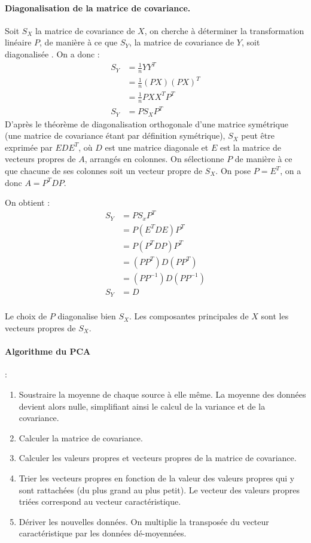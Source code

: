 \paragraph{Diagonalisation de la matrice de covariance.} Soit $S_X$ la matrice de covariance de $X$, on cherche à déterminer la transformation linéaire $P$, de manière à ce que $S_Y$, la matrice de covariance de $Y$, soit diagonalisée \cite{PCA}  \cite{PCA2}. 
On a donc : 
\begin{equation}
	\begin{split}
	 S_Y &= \frac{1}{n}YY^T \\
	&= \frac{1}{n}(PX)(PX)^T \\
	&= \frac{1}{n}PXX^TP^T \\
	S_Y &= PS_XP^T 
	\end{split}
\end{equation}
D'après le théorème de diagonalisation orthogonale d'une matrice symétrique (une matrice de covariance étant par définition symétrique), $S_X$ peut être exprimée par $EDE^T$, où $D$ est une matrice diagonale et $E$ est la matrice de vecteurs propres de $A$, arrangés en colonnes. On sélectionne $P$ de manière à ce que chacune de ses colonnes soit un vecteur propre de $S_X$. On pose  $P = E^T$, on a donc $ A = P^TDP$.

On obtient : 
\begin{equation}
	\begin{split}
	S_Y &= PS_xP^T \\
	& = P(E^TDE)P^T \\
	& = P(P^TDP)P^T \\
	& = (PP^T)D(PP^T) \\
	& = (PP^{-1})D(PP^{-1})\\
	S_Y& = D\\ 
	\end{split}
\end{equation}

Le choix de $P$ diagonalise bien $S_X$. Les composantes principales de $X$ sont les vecteurs propres de $S_X$.

\paragraph{Algorithme du PCA} \cite{PCA}  \cite{PCA2}:
\begin{enumerate}
	\item Soustraire la moyenne de chaque source à elle même. La moyenne des données devient alors nulle, simplifiant ainsi le calcul de la variance et de la covariance.
	\item Calculer la matrice de covariance. 
	\item Calculer les valeurs propres et vecteurs propres de la matrice de covariance. 
	\item Trier les vecteurs propres en fonction de la valeur des valeurs propres qui y sont rattachées (du plus grand au plus petit). Le vecteur des valeurs propres triées correspond au vecteur caractéristique. 
	\item Dériver les nouvelles données. On multiplie la transposée du vecteur caractéristique par les données dé-moyennées.   
\end{enumerate}

